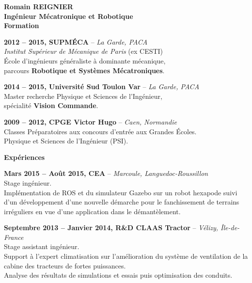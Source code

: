 \documentclass[a4paper,11pt,final]{memoir}
\newcommand{\Sep}{\vspace{1.5em}}
\newcommand{\SmallSep}{\vspace{0.5em}}
\newenvironment{AboutMe}
	{\ignorespaces}%
	{\SmallSep\ignorespacesafterend}
\newcommand{\CVSection}[1]
	{\Large\textbf{#1}\par
	\SmallSep\normalsize\normalfont}
\newcommand{\CVItem}[2]
	{\textbf{\color{RoyalBlue} #1 \color{dark_gray} #2}\normalsize\normalfont}
\newcommand{\city}[1]
	{{\small\color{dark_gray}\emph{#1}}\normalsize\normalfont}
\begin{document}
\Huge\bfseries {\color{RoyalBlue} Romain REIGNIER} \\
\Large\bfseries  Ingénieur Mécatronique et Robotique\\

\CVSection{Formation}

\CVItem{2012 -- 2015,}{SUPMÉCA} -- \city{La Garde, PACA}\\
\emph{Institut Supérieur de Mécanique de Paris} (ex CESTI)\\
École d'ingénieurs généraliste à dominante mécanique, \\parcours \textbf{Robotique et Systèmes Mécatroniques}.
\SmallSep

\CVItem{2014 -- 2015,}{Université Sud Toulon Var} -- \city{La Garde, PACA}\\
Master recherche Physique et Sciences de l'Ingénieur,\\ spécialité \textbf{Vision Commande}.
\SmallSep

\CVItem{2009 -- 2012,}{CPGE Victor Hugo} -- \city{Caen, Normandie}\\
Classes Préparatoires aux concours d'entrée aux Grandes Écoles.\\
Physique et Sciences de l'Ingénieur (PSI).

\Sep
\CVSection{Expériences}

\CVItem{Mars 2015 -- Août 2015,}{CEA} -- \city{Marcoule, Languedoc-Roussillon}\\
Stage ingénieur.\\
Implémentation de ROS et du simulateur Gazebo sur un robot hexapode suivi d'un développement d'une nouvelle démarche pour le fanchissement de terrains irréguliers en vue d'une application dans le démantèlement.
\SmallSep

\CVItem{Septembre 2013 -- Janvier 2014,}{R\&D CLAAS Tractor} -- \city{Vélizy, Île-de-France}\\
Stage assistant ingénieur.\\
Support à l'expert climatisation sur l'amélioration du système de ventilation de la cabine des tracteurs de fortes puissances.\\
Analyse des résultats de simulations et essais puis optimisation des conduits.
\SmallSep
\end{document}
